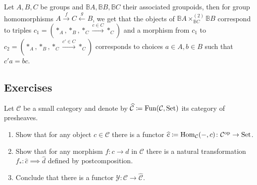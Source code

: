 \begin{exmp}
	Let $ A , B , C $ be groups and $ \mathbb{B} A , \mathbb{B} B , \mathbb{B} C $ their associated groupoids, then for group homomorphisms $ A \xrightarrow { f } C  \xleftarrow { g } B $,
	we get that the objects of $ \mathbb{ B } A \times^{ ( 2 ) }_{ \mathbb{ B } C }  \mathbb{ B } B $ correspond to triples $ c_1 = ( *_A , *_B , *_C \xrightarrow{ c \in C } *_C ) $ and a morphism from $ c_1 $ to $ c_2 = ( *_A , *_B , *_C \xrightarrow{ c' \in C } *_C ) $ corresponds to choices $ a \in A , b \in B $ such that $ c' a = b c $.
\end{exmp}

\subsection{Exercises}

\begin{Exercise}
	Let $ \mathcal{ C } $ be a small category and denote by $ \widehat{ \mathcal{ C } } \coloneqq \operatorname{Fun} ( \mathcal{ C } , \operatorname{Set} ) $ its category of presheaves.
	\begin{enumerate}[label=(\alph*)]
		\item 
		Show that for any object $ c \in \mathcal{ C } $ there is a functor $ \widehat{ c } \coloneqq \operatorname{Hom}_{ \mathcal{ C } } ( -, c ) \colon \mathcal{ C }^{\operatorname{op}} \to \operatorname{Set} $.
		
		\item 
		Show that for any morphism $ f \colon c \to d $ in $ \mathcal{ C } $ there is a natural transformation $ f_* \colon \widehat{ c } \implies \widehat{ d } $ defined by postcomposition.
		
		\item 
		Conclude that there is a functor $ \mathcal{ Y } \colon \mathcal{ C } \to \widehat{\mathcal{ C }}$.
	\end{enumerate}
\end{Exercise}

